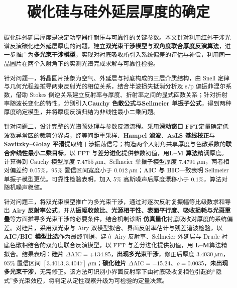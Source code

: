 \documentclass[withoutpreface,bwprint]{cumcmthesis}
\title{碳化硅与硅外延层厚度的确定}
\begin{document}
\maketitle

\begin{abstract}

碳化硅外延层厚度是决定功率器件耐压与可靠性的关键参数。本文针对利用红外干涉光谱反演碳化硅外延层厚度的问题，建立\textbf{双光束干涉模型}与\textbf{双角度联合厚度反演算法}，进一步推广为\textbf{多光束干涉模型}，实现对衬底吸收所引入系统偏差的评估与补偿，利用同一晶圆片在两个入射角下的实测光谱完成求解与可靠性检验。

针对问题一，将晶圆片抽象为空气、外延层与衬底构成的三层介质结构，由 Snell 定律与几何光程差推导两束反射光的相位关系，结合半波损失抵消分析及 s/p 偏振菲涅尔系数，借助 Stokes 倒逆关系建立反射率与厚度、折射率之间的显式函数关系；针对折射率随波长变化的特性，分别引入\textbf{Cauchy 色散公式}与\textbf{Sellmeier 单振子公式}，得到两种厚度确定模型，并将厚度反演归结为非线性最小二乘问题。

针对问题二，设计完整的光谱预处理与参数反演流程。采用\textbf{滑动窗口 FFT}定量确定低波数异常区的裁剪分界点，经等间距重采样、\textbf{Hampel 滤波}、\textbf{AsLS 基线校正}与\textbf{Savitzky--Golay 平滑}提取纯干涉振荡信号；构造两个入射角共享厚度与色散系数的\textbf{联合非线性最小二乘目标}，以 FFT 与\textbf{差分进化}提供参数初值，用\textbf{L--M 算法}精调厚度。计算得到 Cauchy 模型厚度 $\mathbf{7.4755}\ \mu$m、Sellmeier 单振子模型厚度 $\mathbf{7.4791}\ \mu$m，两者相对偏差约 $0.05\%$，95\% 置信区间宽度小于 $0.012\ \mu$m；\textbf{AIC 与 BIC}一致表明 Sellmeier 单振子模型更优。可靠性检验表明，加入 $5\%$ 高斯噪声后厚度漂移小于 $0.1\%$，算法对随机噪声稳健。

针对问题三，将双光束模型推广为多光束干涉，通过对逐次反射复振幅等比级数求和导出 \textbf{Airy 反射率公式}，并从\textbf{振幅收敛比、光源相干性、表面平行度、吸收损耗与光斑重叠}等方面推导多光束干涉的必要条件，结合机制诊断 \textbf{仿真量化}衬底吸收对厚度的系统偏差。对硅片，采用双光束与 Airy 双模型拟合、界面反射率估计与残差谐波检验，以 \textbf{AIC/BIC 模型比选}作为最终判据，建立 Airy 反射率、Sellmeier 外延层与 Drude 衬底色散相结合的双角度联合反演模型，以 FFT 与差分进化提供初值，用 \textbf{L--M}算法精拟合。结果表明：\textbf{硅片} $\Delta\mathrm{AIC}=+134.85$，\textbf{出现多光束干涉}，修正后厚度 $\mathbf{3.4030}\ \mu$m，95\% 置信区间 $[3.4013, 3.4047]\ \mu$m；\textbf{碳化硅片} $\Delta\mathrm{AIC}=-15.24$、$\rho=0.0035$，\textbf{未出现多光束干涉}，无需修正。该方法可识别小界面反射率下由衬底吸收复相位引起的“隐式”多光束效应，将判定从定性观察升级为可检验的定量决策。


\end{abstract}
\end{document}
